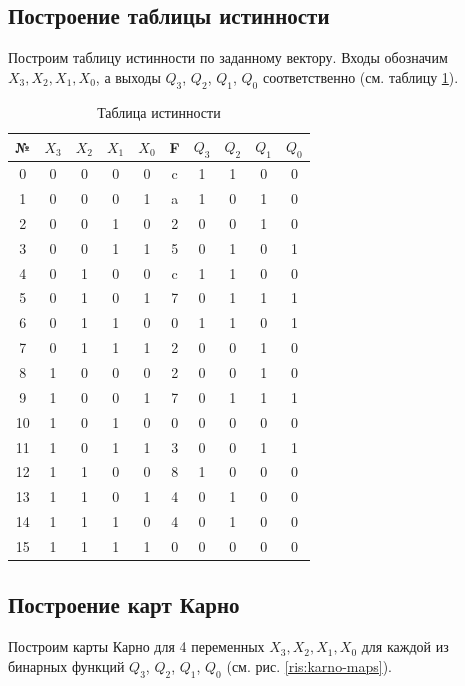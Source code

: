 \documentclass[a4paper,14pt]{extarticle}
\begin{document}
\subsection{Построение таблицы истинности}
Построим таблицу истинности по заданному вектору. Входы обозначим $X_3, X_2, X_1, X_0$, а выходы $Q_3$,  $Q_2$, $Q_1$,  $Q_0$ соответственно (см. таблицу \ref{tab:func-table}).

\newpage
\begin{table}[htbp]
	
\begin{center}
		\begin{tabular}{|c||c|c|c|c||c||c|c|c|c|}
		\hline
		№ & $X_3$ & $X_2$ & $X_1$ & $X_0$ & F & $Q_3$ & $Q_2$ & $Q_1$ & $Q_0$ \\ \hline \hline
		0 & 0 & 0 & 0 & 0 & c & 1 & 1 & 0 & 0 \\ \hline
		1 & 0 & 0 & 0 & 1 & a & 1 & 0 & 1 & 0 \\ \hline
		2 & 0 & 0 & 1 & 0 & 2 & 0 & 0 & 1 & 0 \\ \hline
		3 & 0 & 0 & 1 & 1 & 5 & 0 & 1 & 0 & 1 \\ \hline
		4 & 0 & 1 & 0 & 0 & c & 1 & 1 & 0 & 0 \\ \hline
		5 & 0 & 1 & 0 & 1 & 7 & 0 & 1 & 1 & 1 \\ \hline
		6 & 0 & 1 & 1 & 0 & 0 & 1 & 1 & 0 & 1 \\ \hline
		7 & 0 & 1 & 1 & 1 & 2 & 0 & 0 & 1 & 0 \\ \hline
		8 & 1 & 0 & 0 & 0 & 2 & 0 & 0 & 1 & 0 \\ \hline
		9 & 1 & 0 & 0 & 1 & 7 & 0 & 1 & 1 & 1 \\ \hline
		10 & 1 & 0 & 1 & 0 & 0 & 0 & 0 & 0 & 0 \\ \hline
		11 & 1 & 0 & 1 & 1 & 3 & 0 & 0 & 1 & 1 \\ \hline
		12 & 1 & 1 & 0 & 0 & 8 & 1 & 0 & 0 & 0 \\ \hline
		13 & 1 & 1 & 0 & 1 & 4 & 0 & 1 & 0 & 0 \\ \hline
		14 & 1 & 1 & 1 & 0 & 4 & 0 & 1 & 0 & 0 \\ \hline
		15 & 1 & 1 & 1 & 1 & 0 & 0 & 0 & 0 & 0 \\ \hline
	\end{tabular}
\end{center}
	\caption{Таблица истинности}
	\label{tab:func-table}
\end{table}

\subsection{Построение карт Карно}
Построим карты Карно для 4 переменных $X_3, X_2, X_1, X_0$ для каждой из бинарных функций $Q_3$,  $Q_2$, $Q_1$,  $Q_0$ (см. рис. \ref{ris:karno-maps}).
\end{document}
